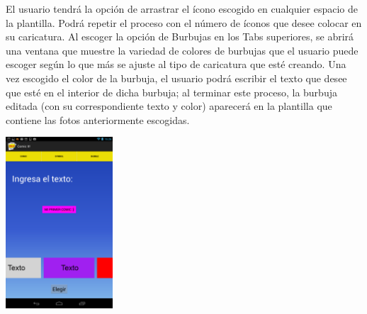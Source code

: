 \documentclass[12pt]{report}
\begin{document}

El usuario tendrá la opción de arrastrar el ícono escogido en cualquier espacio de la plantilla. Podrá repetir el proceso con el número de íconos que desee colocar en su caricatura.
Al escoger la opción de Burbujas en los Tabs superiores, se abrirá una ventana que muestre la variedad de colores de burbujas que el usuario puede escoger según lo que más se ajuste al tipo de caricatura que esté creando. Una vez escogido el color de la burbuja, el usuario podrá escribir el texto que desee que esté en el interior de dicha burbuja; al terminar este proceso, la burbuja editada (con su correspondiente texto y color) aparecerá en la plantilla que contiene las fotos anteriormente escogidas.

	\begin{center}
		\begingroup
			\includegraphics[width=0.30\textwidth]{imagenes_usuario/texto.png}
		\endgroup
	\end{center}
\end{document}
